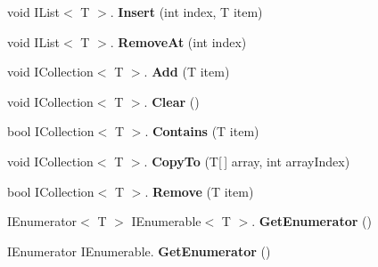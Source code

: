 \begin{DoxyCompactItemize}
\mbox{\label{struct_shared_memory_1_1_utilities_1_1_array_slice_aff4c0f36416d60b27fc9ff03db4a3daa}} 
void I\+List$<$ T $>$. {\bfseries Insert} (int index, T item)
\item 
\mbox{\label{struct_shared_memory_1_1_utilities_1_1_array_slice_a9fd62a2f4a1505b8f264b573d50a7966}} 
void I\+List$<$ T $>$. {\bfseries Remove\+At} (int index)
\item 
\mbox{\label{struct_shared_memory_1_1_utilities_1_1_array_slice_af8123877f8eed4b10015a442bc9b3e2a}} 
void I\+Collection$<$ T $>$. {\bfseries Add} (T item)
\item 
\mbox{\label{struct_shared_memory_1_1_utilities_1_1_array_slice_a0f355eb6a8fdea4223bca30dff23173e}} 
void I\+Collection$<$ T $>$. {\bfseries Clear} ()
\item 
\mbox{\label{struct_shared_memory_1_1_utilities_1_1_array_slice_ac25849e75e5ae789c12ded828a78e1a5}} 
bool I\+Collection$<$ T $>$. {\bfseries Contains} (T item)
\item 
\mbox{\label{struct_shared_memory_1_1_utilities_1_1_array_slice_a45ad3323ce754c400564873706017f7b}} 
void I\+Collection$<$ T $>$. {\bfseries Copy\+To} (T\mbox{[}$\,$\mbox{]} array, int array\+Index)
\item 
\mbox{\label{struct_shared_memory_1_1_utilities_1_1_array_slice_a6fefa6b8a0c305c2a4ad961dfd191f1b}} 
bool I\+Collection$<$ T $>$. {\bfseries Remove} (T item)
\item 
\mbox{\label{struct_shared_memory_1_1_utilities_1_1_array_slice_a8a15eb6237f86e9d90580a2cc43cf6a7}} 
I\+Enumerator$<$ T $>$ I\+Enumerable$<$ T $>$. {\bfseries Get\+Enumerator} ()
\item 
\mbox{\label{struct_shared_memory_1_1_utilities_1_1_array_slice_a6f4a4e4bf120767fc7b8926dde051ebd}} 
I\+Enumerator I\+Enumerable. {\bfseries Get\+Enumerator} ()
\end{DoxyCompactItemize}

